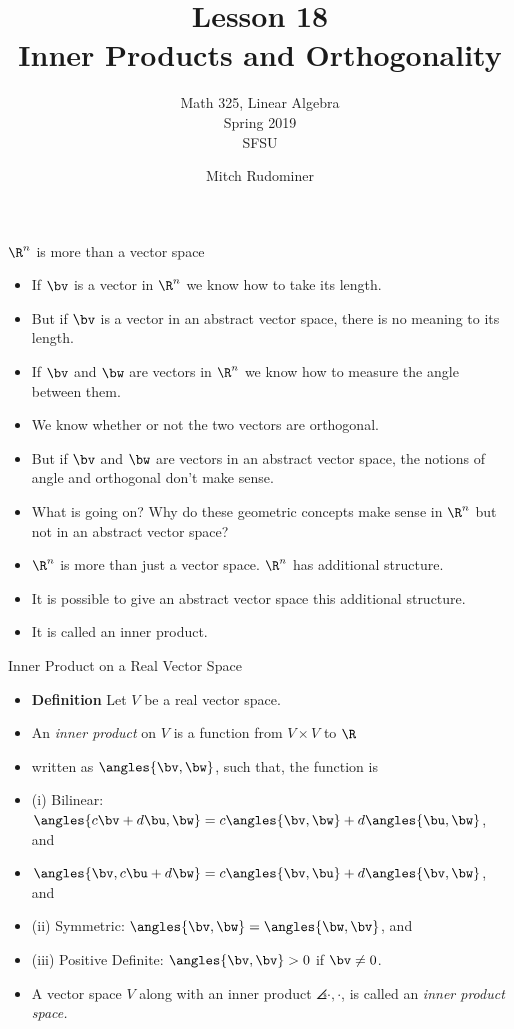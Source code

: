 \documentclass{beamer}
\title{Lesson 18 \\ Inner Products and Orthogonality}
\subtitle{Math 325, Linear Algebra \\ Spring 2019 \\ SFSU}
\author{Mitch Rudominer}
\date{}
\begin{document}
\begin{frame}
  \titlepage
\end{frame}


\begin{frame}{$\R^n$ is more than a vector space}

\begin{itemize}
\item If $\bv$ is a vector in $\R^n$ we know how to take its length.
\item But if $\bv$ is a vector in an abstract vector space, there is no meaning to its length.
\item If $\bv$ and $\bw$ are vectors in $\R^n$ we know how to measure the angle between them.
\item We know whether or not the two vectors are orthogonal.
\item But if $\bv$ and $\bw$ are vectors in an abstract vector space, the notions of angle and orthogonal don't make sense.
\item What is going on? Why do these geometric concepts make sense in $\R^n$ but not in an abstract vector space?
\item $\R^n$ is more than just a vector space. $\R^n$ has additional structure.
\item It is possible to give an abstract vector space this additional structure.
\item It is called an inner product.
\end{itemize}
\end{frame}


\begin{frame}{Inner Product on a Real Vector Space}

\begin{itemize}
\item \textbf{Definition} Let $V$ be a real vector space.
\item An \emph{inner product} on $V$ is a function from $V\times V$ to $\R$
\item written as $\angles{\bv,\bw}$, such that, the function is
\item (i) Bilinear: $\angles{c\bv+d\bu,\bw} = c\angles{\bv,\bw} + d\angles{\bu,\bw}$, and
\item $\angles{\bv,c\bu + d\bw} = c\angles{\bv,\bu} + d\angles{\bv,\bw}$, and
\item (ii) Symmetric: $\angles{\bv,\bw}=\angles{\bw,\bv}$, and
\item (iii) Positive Definite: $\angles{\bv,\bv} > 0$ if $\bv\not=0$.
\item A vector space $V$ along with an inner product $\angles{\cdot, \cdot}$, is
called an \emph{inner product space.}
\end{itemize}
\end{frame}
\end{document}
